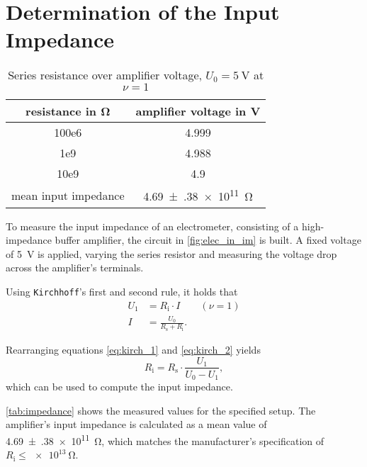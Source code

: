 \section{Determination of the Input Impedance}
\begin{table}[b!]
	\centering
	\caption[Series resistance over amplifier voltage]{Series resistance over amplifier voltage, $U_0=\SI{5}{\volt}$ at $\nu=1$}
	\label{tab:impedance}
	\begin{tabular}{SS}
		\toprule
		{resistance in \si{\ohm}}	&	{amplifier voltage in \si{\volt}}	\\
		\midrule
			100e6	&	4.999	\\
			1e9	&	4.988	\\
			10e9	&	4.9	\\
		\midrule
		{mean input impedance}	&	\SI{4.69(38)e11}{\ohm}\\
		\bottomrule
	\end{tabular}
\end{table}
To measure the input impedance of an electrometer, consisting of a high-impedance buffer amplifier, the circuit in \autoref{fig:elec_in_im} is built.
A fixed voltage of \SI{5}{\volt} is applied, varying the series resistor and measuring the voltage drop across the amplifier's terminals.

Using \texttt{Kirchhoff}'s first and second rule, it holds that
\begin{align}
	U_1	&= 	R_\text{i}\cdot I \label{eq:kirch_1}\qquad(\nu = 1)\\
	I 					&=	\frac{U_0}{R_\text{s}+R_\text{i}}.	\label{eq:kirch_2}
\end{align}

Rearranging equations \ref{eq:kirch_1} and \ref{eq:kirch_2} yields
\begin{equation}
	R_\text{i}=R_\text{s}\cdot\frac{U_1}{U_0-U_1},
\end{equation}
which can be used to compute the input impedance.

\autoref{tab:impedance} shows the measured values for the specified setup.
The amplifier's input impedance is calculated as a mean value of \SI{4.69(38)e11}{\ohm}, which matches the manufacturer's specification of $R_\text{i}\leq\SI{e13}{\ohm}$.
